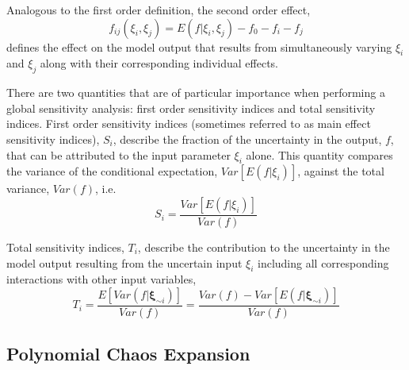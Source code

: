 \documentclass{article}
\begin{document}
Analogous to the first order definition, the second order effect,
$$ f_{ij}(\xi_i,\xi_j) = E(f|\xi_i,\xi_j) - f_0 - f_i - f_j $$
defines the effect on the model output that results from simultaneously varying
$\xi_i$ and $\xi_j$ along with their corresponding individual effects. \newline

There are two quantities that are of particular importance when performing
a global sensitivity analysis: first order sensitivity indices and total
sensitivity indices.  First order sensitivity indices (sometimes referred to as
main effect sensitivity indices), $S_{i}$, describe the fraction of the
uncertainty in the output, $f$, that can be attributed to the input parameter
$\xi_i$ alone. This quantity compares the variance \cite{spectral} of
the conditional expectation, $Var[E(f|\xi_i)]$, against the total variance,
$Var(f)$, i.e.
\begin{equation}
      S_i = \frac{Var[E(f|\xi_i)]}{Var(f)}
      \label{eq:si}
\end{equation}

Total sensitivity indices, $T_i$, describe the contribution to the uncertainty
in the model output resulting from the uncertain input $\xi_i$ including all
corresponding interactions with other input variables, 
\begin{equation}
      T_i = \frac{E[Var(f|\boldsymbol{\xi}_{\sim i})]}{Var(f)} =
      \frac{Var(f) - Var[E(f|\boldsymbol{\xi}_{\sim i})]}{Var(f)}
\end{equation}

\subsection{Polynomial Chaos Expansion}
\end{document}
